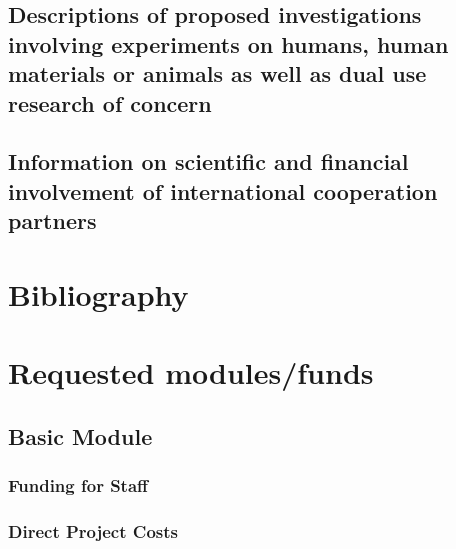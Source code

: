 \documentclass{dfg_en}
\begin{document}
\subsection{Descriptions of proposed investigations involving experiments on humans, human materials or animals as well as dual use research of concern}


\subsection{Information on scientific and financial involvement of international cooperation partners}



\pagebreak

\section{Bibliography}
%
\vspace{-0.5cm}
\setlength\bibitemsep{0pt}
\begin{multicols}{2} 
	{\scriptsize
	\printbibliography[heading=Lit,notcategory=publikationen_juerjens, notcategory=publikationen_schneider,notcategory=publikationen-andere,notcategory=patente-angemeldet,notcategory=patente-akzeptiert]}
\end{multicols}
%


\section{Requested modules/funds}
%

\subsection{Basic Module}

\subsubsection{Funding for Staff}


\subsubsection{Direct Project Costs}
%
\end{document}
